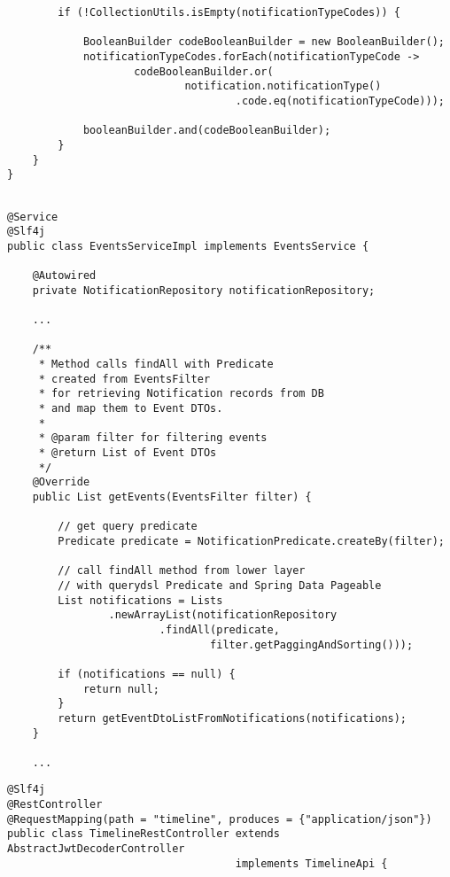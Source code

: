 \documentclass[twoside, 12pt]{article}
\begin{document}
{{\begin{lstlisting}
        if (!CollectionUtils.isEmpty(notificationTypeCodes)) {

            BooleanBuilder codeBooleanBuilder = new BooleanBuilder();
            notificationTypeCodes.forEach(notificationTypeCode ->
                    codeBooleanBuilder.or(
                            notification.notificationType()
                                    .code.eq(notificationTypeCode)));

            booleanBuilder.and(codeBooleanBuilder);
        }
    }
}
\end{lstlisting}

\clearpage


\begin{lstlisting}

@Service
@Slf4j
public class EventsServiceImpl implements EventsService {

    @Autowired
    private NotificationRepository notificationRepository;

    ...

    /**
     * Method calls findAll with Predicate
     * created from EventsFilter
     * for retrieving Notification records from DB
     * and map them to Event DTOs.
     *
     * @param filter for filtering events
     * @return List of Event DTOs
     */
    @Override
    public List getEvents(EventsFilter filter) {

        // get query predicate
        Predicate predicate = NotificationPredicate.createBy(filter);

        // call findAll method from lower layer
        // with querydsl Predicate and Spring Data Pageable
        List notifications = Lists
                .newArrayList(notificationRepository
                        .findAll(predicate,
                                filter.getPaggingAndSorting()));

        if (notifications == null) {
            return null;
        }
        return getEventDtoListFromNotifications(notifications);
    }

    ...

\end{lstlisting}

\clearpage


\begin{lstlisting}
@Slf4j
@RestController
@RequestMapping(path = "timeline", produces = {"application/json"})
public class TimelineRestController extends AbstractJwtDecoderController
                                    implements TimelineApi {


\end{lstlisting}}}
\end{document}
